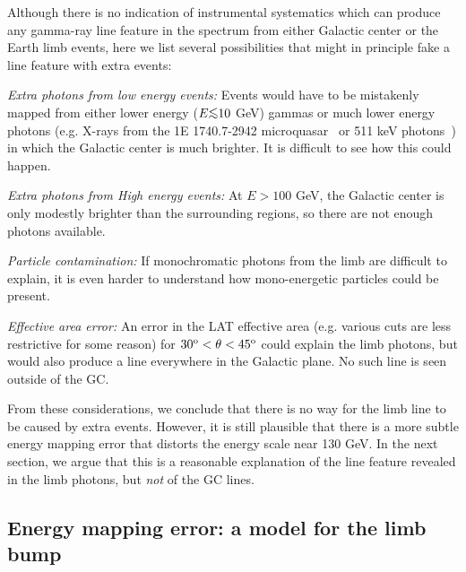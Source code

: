 \documentclass[aps,twocolumn,prd,superscriptaddress,showpacs,nofootinbib,fixfloat]{revtex4}
\newcommand{\degree}{^{\rm o}}
\def\la{\vcenter{\hbox{$<$}\offinterlineskip\hbox{$\sim$}}}
\begin{document}
Although there is no indication of instrumental systematics
which can produce any gamma-ray line feature in the spectrum
from either Galactic center or the Earth limb events, here
we list several possibilities that might in principle fake a
line feature with extra events:

{\it Extra photons from low energy events:} Events would
have to be mistakenly mapped from either lower energy ($E
\la 10$ GeV) gammas or much lower energy photons (e.g.
X-rays from the 1E 1740.7-2942 microquasar~\cite{Gallo:2002}
or 511 keV photons~\cite{Prantzos:2011}) in which the
Galactic center is much brighter.  It is difficult to see
how this could happen.

{\it Extra photons from High energy events:} At $E > 100$
GeV, the Galactic center is only modestly brighter than the
surrounding regions, so there are not enough photons
available.

{\it Particle contamination:} If monochromatic photons from
the limb are difficult to explain, it is even harder to
understand how mono-energetic particles could be present.

{\it Effective area error:} An error in the LAT effective
area (e.g. various cuts are less restrictive for some
reason) for $30\degree < \theta < 45\degree$ could explain
the limb photons, but would also produce a line everywhere
in the Galactic plane.  No such line is seen outside of the
GC.\medskip

From these considerations, we conclude that there is no way
for the limb line to be caused by extra events. However, it
is still plausible that there is a more subtle energy
mapping error that distorts the energy scale near 130 GeV.
In the next section, we argue that this is a reasonable
explanation of the line feature revealed in the limb
photons, but {\em not} of the GC lines. 

\subsection{Energy mapping error: a model for the limb bump}

 
\end{document}
